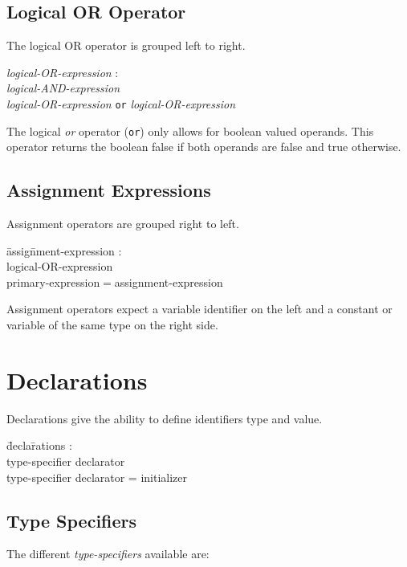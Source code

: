 \documentclass{article}
\begin{document}
\subsection{Logical OR Operator}
The logical OR operator is grouped left to right.
\begin{tabbing}
	\= \emph{logi}\=\emph{cal-OR-expression} : \\
		\>\> \emph{logical-AND-expression} \\
		\>\> \emph{logical-OR-expression} \texttt{or} \emph{logical-OR-expression} 
\end{tabbing}
The logical \emph{or} operator (\texttt{or}) only allows for boolean valued operands. This operator returns the boolean false if both operands are false and true otherwise.

\subsection{Assignment Expressions}
Assignment operators are grouped right to left.
\begin{itshape}
\begin{tabbing}
	\= assig\=nment-expression : \\
		\>\> logical-OR-expression \\
		\>\> primary-expression$=$assignment-expression 
\end{tabbing}
\end{itshape}
Assignment operators expect a variable identifier on the left and a constant or variable of the same type on the right side.


\section{Declarations}

Declarations give the ability to define identifiers type and value.
\begin{itshape}
\begin{tabbing}
	\= decla\=rations : \\
		\> \> type-specifier declarator \\
		\>\> type-specifier declarator = initializer \\
\end{tabbing}
\end{itshape}

\subsection{Type Specifiers}
The different \emph{type-specifiers} available are:
\end{document}
